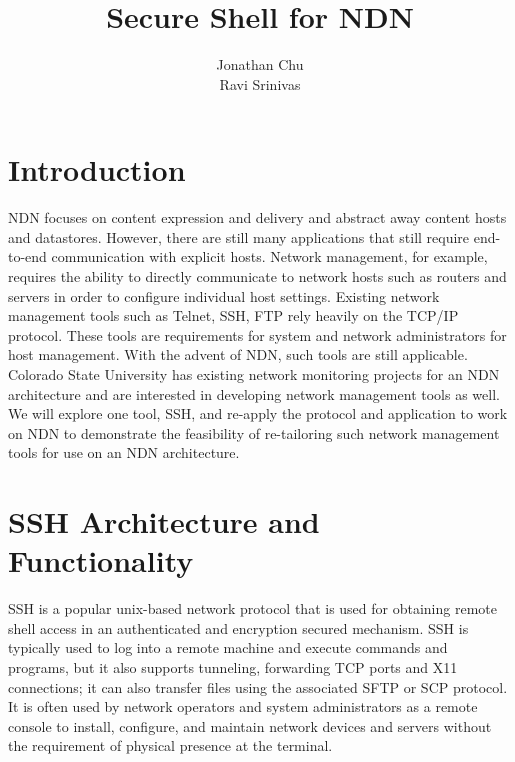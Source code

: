 \documentclass{acm_proc_article-sp}
\begin{document}
\title{Secure Shell for NDN}
\author{
\alignauthor
Jonathan Chu\\
\alignauthor
Ravi Srinivas\\
}

\maketitle

\begin{abstract}



\end{abstract}

\section{Introduction}

NDN focuses on content expression and delivery and abstract away content hosts and datastores. However, there are still many applications that still require end-to-end communication with explicit hosts. Network management, for example, requires the ability to directly communicate to network hosts such as routers and servers in order to configure individual host settings. Existing network management tools such as Telnet, SSH, FTP rely heavily on the TCP/IP protocol. These tools are requirements for system and network administrators for host management. With the advent of NDN, such tools are still applicable. Colorado State University has existing network monitoring projects for an NDN architecture and are interested in developing network management tools as well. We will explore one tool, SSH, and re-apply the protocol and application to work on NDN to demonstrate the feasibility of re-tailoring such network management tools for use on an NDN architecture.

\section{SSH Architecture and Functionality}

SSH is a popular unix-based network protocol that is used for obtaining remote shell access in an authenticated and encryption secured mechanism. SSH is typically used to log into a remote machine and execute commands and programs, but it also supports tunneling, forwarding TCP ports and X11 connections; it can also transfer files using the associated SFTP or SCP protocol. It is often used by network operators and system administrators as a remote console to install, configure, and maintain network devices and servers without the requirement of physical presence at the terminal.
\end{document}

